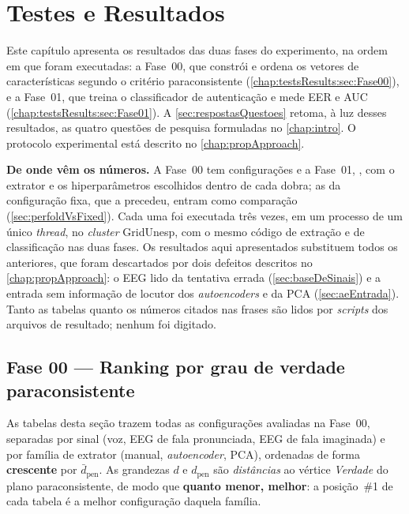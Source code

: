 \chapter{Testes e Resultados} \label{chap:testsResults}

	\par Este capítulo apresenta os resultados das duas fases do experimento, na
	ordem em que foram executadas: a Fase~00, que constrói e ordena os vetores de
	características segundo o critério paraconsistente
	(\autoref{chap:testsResults:sec:Fase00}), e a Fase~01, que treina o
	classificador de autenticação e mede \ac{EER} e \ac{AUC}
	(\autoref{chap:testsResults:sec:Fase01}). A \autoref{sec:respostasQuestoes}
	retoma, à luz desses resultados, as quatro questões de pesquisa formuladas no
	\autoref{chap:intro}. O protocolo experimental está descrito no
	\autoref{chap:propApproach}.

	\par \textbf{De onde vêm os números.} A Fase~00 tem 
	configurações e a Fase~01, , com o extrator e os
	hiperparâmetros escolhidos dentro de cada dobra; as  da
	configuração fixa, que a precedeu, entram como comparação
	(\autoref{sec:perfoldVsFixed}). Cada uma foi executada três
	vezes, em um processo de um único \textit{thread}, no \textit{cluster}
	GridUnesp, com o mesmo código de extração e de classificação nas duas fases. Os resultados
	aqui apresentados substituem todos os anteriores, que foram descartados por
	dois defeitos descritos no \autoref{chap:propApproach}: o \ac{EEG} lido da
	tentativa errada (\autoref{sec:baseDeSinais}) e a entrada sem informação de
	locutor dos \textit{autoencoders} e da \ac{PCA}
	(\autoref{sec:aeEntrada}). Tanto as tabelas quanto os números
	citados nas frases são lidos por \textit{scripts} dos arquivos de resultado;
	nenhum foi digitado.

	\section{Fase 00 --- Ranking por grau de verdade paraconsistente}
	\label{chap:testsResults:sec:Fase00}

	\par As tabelas desta seção trazem todas as configurações avaliadas na
	Fase~00, separadas por sinal (voz, \ac{EEG} de fala pronunciada, \ac{EEG} de
	fala imaginada) e por família de extrator (manual, \textit{autoencoder},
	\ac{PCA}), ordenadas de forma \textbf{crescente} por $\bar{d}_{\text{pen}}$.
	As grandezas $d$ e $d_{\text{pen}}$ são \emph{distâncias} ao vértice
	\textit{Verdade} do plano paraconsistente, de modo que \textbf{quanto menor,
	melhor}: a posição~\#1 de cada tabela é a melhor configuração daquela
	família.

